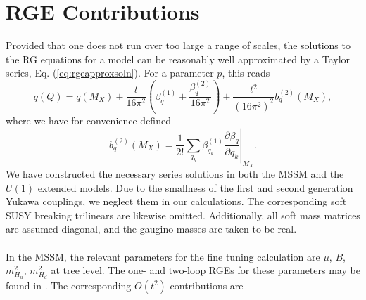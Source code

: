 \documentclass[preprint,amsmath,amssymb,aps,superscriptaddress,prd,showpacs,floatfix]{revtex4-1}
\begin{document}
\section{\label{app:rges}RGE Contributions}
Provided that one does not run over too large a range of scales, the solutions to the
RG equations for a model can be reasonably well approximated by a Taylor series, Eq. (\ref{eq:rgeapproxsoln}). 
For a parameter $p$, this reads
\begin{equation*}
q(Q)=q(M_X)+\frac{t}{16\pi^2}\left ( \beta_q^{(1)}+\frac{\beta_q^{(2)}}{16\pi^2}\right )+\frac{t^2}{(16\pi^2)^2}b_q^{(2)}(M_X),
\end{equation*}
where we have for convenience defined
\begin{equation*}
b_q^{(2)}(M_X)=\frac{1}{2!}\left . \sum_{q_k}\beta_{q_k}^{(1)}\frac{\partial \beta_q}{\partial q_k}\right |_{M_X}.
\end{equation*}
We have constructed the necessary series solutions in both the MSSM and the $U(1)$ extended models. Due to the smallness of the first and second generation Yukawa couplings, we neglect them in our calculations. The corresponding soft SUSY breaking 
trilinears are likewise omitted. Additionally, all soft mass matrices are assumed diagonal, and the gaugino masses are taken to be real.\\ \\
In the MSSM, the relevant parameters for the fine tuning calculation are $\mu$, $B$, $m_{H_u}^2$, $m_{H_d}^2$ at tree level. The one- and two-loop RGEs for these parameters may be found in \cite{Martin:1993zk}. The corresponding $O(t^2)$ contributions are
\end{document}
